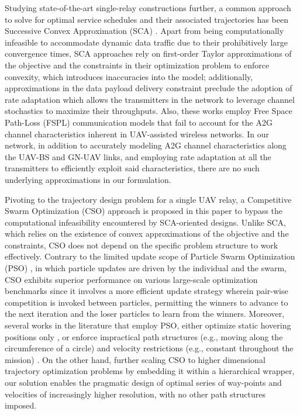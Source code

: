 \documentclass[12pt, draftcls, onecolumn]{IEEEtran}
\theoremstyle{plain}
\theoremstyle{definition}
\theoremstyle{remark}
\begin{document}
Studying state-of-the-art single-relay constructions further, a common approach to solve for optimal service schedules and their associated trajectories has been Successive Convex Approximation (SCA) \cite{SCA, PAoI, MEC-CVX, Rician}. Apart from being computationally infeasible to accommodate dynamic data traffic due to their prohibitively large convergence times, SCA approaches rely on first-order Taylor approximations of the objective and the constraints in their optimization problem to enforce convexity, which introduces inaccuracies into the model; additionally, approximations in the data payload delivery constraint preclude the adoption of rate adaptation which allows the transmitters in the network to leverage channel stochastics to maximize their throughputs. Also, these works employ Free Space Path-Loss (FSPL) communication models that fail to account for the A2G channel characteristics inherent in UAV-assisted wireless networks. In our network, in addition to accurately modeling A2G channel characteristics along the UAV-BS and GN-UAV links, and employing rate adaptation at all the transmitters to efficiently exploit said characteristics, there are no such underlying approximations in our formulation.

Pivoting to the trajectory design problem for a single UAV relay, a Competitive Swarm Optimization (CSO) \cite{CSO} approach is proposed in this paper to bypass the computational infeasibility encountered by SCA-oriented designs. Unlike SCA, which relies on the existence of convex approximations of the objective and the constraints, CSO does not depend on the specific problem structure to work effectively. Contrary to the limited update scope of Particle Swarm Optimization (PSO) \cite{PSO}, in which particle updates are driven by the individual and the swarm, CSO exhibits superior performance on various large-scale optimization benchmarks \cite{CSO} since it involves a more efficient update strategy wherein pair-wise competition is invoked between particles, permitting the winners to advance to the next iteration and the loser particles to learn from the winners. Moreover, several works in the literature that employ PSO, either optimize static hovering positions only \cite{Efficient3DPlacementPSO, 3DDeploymentPSO}, or enforce impractical path structures (e.g., moving along the circumference of a circle) \cite{PSOPathStructure} and velocity restrictions (e.g., constant throughout the mission) \cite{PAoI}. On the other hand, further scaling CSO to higher dimensional trajectory optimization problems by embedding it within a hierarchical wrapper, our solution enables the pragmatic design of optimal series of way-points and velocities of increasingly higher resolution, with no other path structures imposed.
\end{document}
